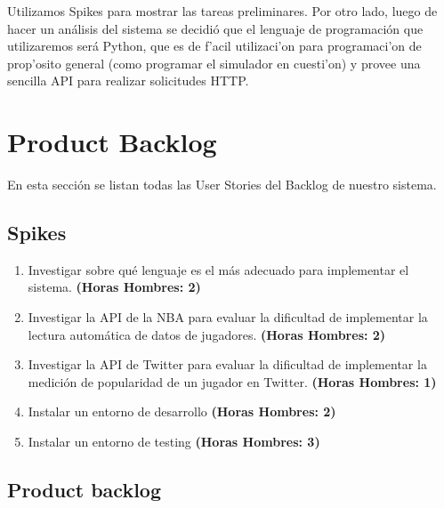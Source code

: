 \documentclass[a4paper, 10pt, twoside]{article}
\begin{document}
Utilizamos Spikes para mostrar las tareas preliminares. 
Por otro lado, luego de hacer un an\'alisis del sistema se decidi\'o que el lenguaje de programaci\'on que utilizaremos ser\'a Python, que es de f'acil utilizaci'on para programaci'on de prop'osito general (como programar el simulador en cuesti'on) y provee una sencilla API para realizar solicitudes HTTP.


\section{Product Backlog}
En esta secci\'on se listan todas las User Stories del Backlog de nuestro sistema.

\subsection{Spikes}

\begin{enumerate}
    \item Investigar sobre qu\'e lenguaje es el m\'as adecuado para implementar el sistema. \textbf{(Horas Hombres: 2)}
    \item Investigar la API de la NBA para evaluar la dificultad de implementar la lectura autom\'atica de datos de jugadores. \textbf{(Horas Hombres: 2)}
    \item Investigar la API de Twitter para evaluar la dificultad de implementar la medici\'on de popularidad de un jugador en Twitter. \textbf{(Horas Hombres: 1)}
    \item Instalar un entorno de desarrollo \textbf{(Horas Hombres: 2)}
    \item Instalar un entorno de testing  \textbf{(Horas Hombres: 3)}
\end{enumerate}


\subsection{Product backlog}
\end{document}
